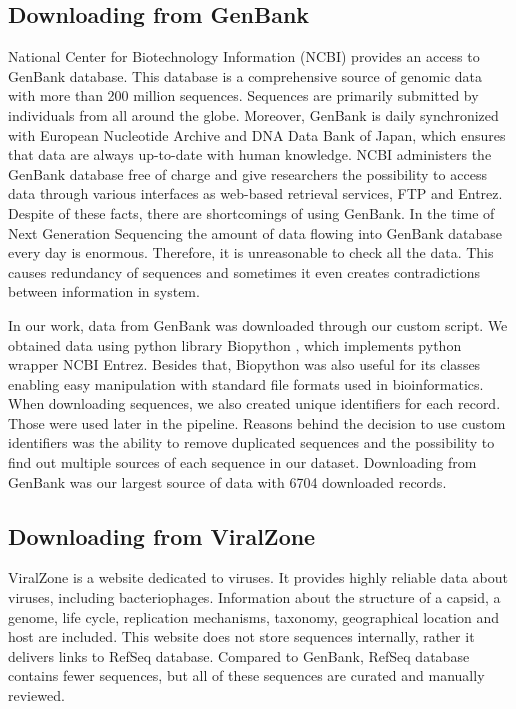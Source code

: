 \subsection{Downloading from GenBank}
National Center for Biotechnology Information (NCBI) provides an access to GenBank\cite{genbank} database.
This database is a comprehensive source of genomic data with more than 200 million sequences.
Sequences are primarily submitted by individuals from all around the globe.
Moreover, GenBank is daily synchronized with European Nucleotide Archive and DNA Data Bank of Japan, which ensures that data are always up-to-date with human knowledge.
NCBI administers the GenBank database free of charge and give researchers the possibility to access data through various interfaces as web-based retrieval services, FTP and Entrez\cite{entrez}.
Despite of these facts, there are shortcomings of using GenBank.
In the time of Next Generation Sequencing the amount of data flowing into GenBank database every day is enormous.
Therefore, it is unreasonable to check all the data.
This causes redundancy of sequences and sometimes it even creates contradictions between information in system.

In our work, data from GenBank was downloaded through our custom script.
We obtained data using python library Biopython \cite{biopython}, which implements python wrapper NCBI Entrez.
Besides that, Biopython was also useful for its classes enabling easy manipulation with standard file formats used in bioinformatics.
When downloading sequences, we also created unique identifiers for each record.
Those were used later in the pipeline.
Reasons behind the decision to use custom identifiers was the ability to remove duplicated sequences and the possibility to find out multiple sources of each sequence in our dataset.
Downloading from GenBank was our largest source of data with 6704 downloaded records.

\subsection{Downloading from ViralZone}
ViralZone is a website dedicated to viruses.
It provides highly reliable data about viruses, including bacteriophages.
Information about the structure of a capsid, a genome, life cycle, replication mechanisms, taxonomy, geographical location and host are included.
This website does not store sequences internally, rather it delivers links to RefSeq\cite{refseq} database.
Compared to GenBank, RefSeq database contains fewer sequences, but all of these sequences are curated and manually reviewed.

